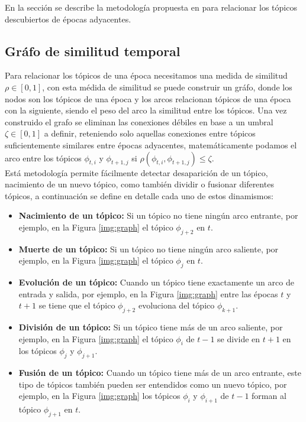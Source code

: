 \documentclass[letterpaper,12pt,oneside]{book} %
\begin{document}
En la sección \label{ref:similarity_graph} se describe la metodología propuesta en \citep{beykikhoshk2018discovering} para relacionar los tópicos descubiertos de épocas adyacentes.

\subsection{Gráfo de similitud temporal}
\label{ref:similarity_graph}
Para relacionar los tópicos de una época necesitamos una medida de similitud $\rho \in [0,1]$, con esta médida de similitud se puede construir un gráfo, donde los nodos son los tópicos de una época y los arcos relacionan tópicos de una época con la siguiente, siendo el peso del arco la similitud entre los tópicos. Una vez construido el grafo se eliminan las conexiones débiles en base a un umbral $\zeta \in [0,1]$ a definir, reteniendo solo aquellas conexiones entre tópicos suficientemente similares entre épocas adyacentes, matemáticamente podamos el arco entre los tópicos $\phi_{t,i}$ y $\phi_{t+1,j}$ si $\rho(\phi_{t,i}, \phi_{t+1,j})\leq \zeta$.\\

Está metodología permite fácilmente detectar desaparición de un tópico, nacimiento de un nuevo tópico, como también dividir o fusionar diferentes tópicos, a continuación se define en detalle cada uno de estos dinamismos:

\begin{itemize}
    \item \textbf{Nacimiento de un tópico:} Si un tópico no tiene ningún arco entrante, por ejemplo, en la Figura \ref{img:graph} el tópico $\phi_{j+2}$ en $t$.
    \item \textbf{Muerte de un tópico:} Si un tópico no tiene ningún arco saliente, por ejemplo, en la Figura \ref{img:graph} el tópico $\phi_{j}$ en $t$.
    \item \textbf{Evolución de un tópico:} Cuando un tópico tiene exactamente un arco de entrada y salida, por ejemplo, en la Figura \ref{img:graph} entre las épocas $t$ y $t+1$ se tiene que el tópico $\phi_{j+2}$ evoluciona del tópico $\phi_{k+1}$.
    \item \textbf{División de un tópico:} Si un tópico tiene más de un arco saliente, por ejemplo, en la Figura \ref{img:graph} el tópico $\phi_{i}$ de $t-1$ se divide en $t+1$ en los tópicos $\phi_{j}$ y $\phi_{j+1}$.
    \item \textbf{Fusión de un tópico:} Cuando un tópico tiene más de un arco entrante, este tipo de tópicos también pueden ser entendidos como un nuevo tópico, por ejemplo, en la Figura \ref{img:graph} los tópicos $\phi_{i}$ y $\phi_{i+1}$ de $t-1$ forman al tópico $\phi_{j+1}$ en $t$.
\end{itemize}
\end{document}
